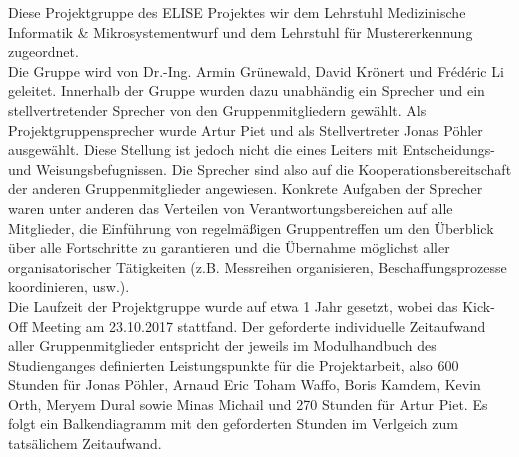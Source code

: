 

Diese Projektgruppe des ELISE Projektes wir dem Lehrstuhl Medizinische Informatik \& Mikrosystementwurf und dem Lehrstuhl für Mustererkennung zugeordnet. \\

Die Gruppe wird von Dr.-Ing. Armin Grünewald, David Krönert und Frédéric Li geleitet. 
Innerhalb der Gruppe wurden dazu unabhändig ein Sprecher und ein stellvertretender Sprecher von den Gruppenmitgliedern gewählt. Als Projektgruppensprecher wurde Artur Piet und als Stellvertreter Jonas Pöhler ausgewählt. 
Diese Stellung ist jedoch nicht die eines Leiters mit Entscheidungs- und Weisungsbefugnissen. Die Sprecher sind also auf die Kooperationsbereitschaft der anderen Gruppenmitglieder angewiesen. 
Konkrete Aufgaben der Sprecher waren unter anderen das Verteilen von Verantwortungsbereichen auf alle Mitglieder, die Einführung von regelmäßigen Gruppentreffen um den Überblick über alle Fortschritte zu garantieren und die Übernahme möglichst aller organisatorischer Tätigkeiten (z.B. Messreihen organisieren, Beschaffungsprozesse koordinieren, usw.). \\

Die Laufzeit der Projektgruppe wurde auf etwa 1 Jahr gesetzt, wobei das Kick-Off Meeting am 23.10.2017 stattfand. Der geforderte individuelle Zeitaufwand aller Gruppenmitglieder entspricht der jeweils im Modulhandbuch des Studienganges definierten Leistungspunkte für die Projektarbeit, also 600 Stunden für Jonas Pöhler, Arnaud Eric Toham Waffo, Boris Kamdem, Kevin Orth, Meryem Dural sowie Minas Michail und 270 Stunden für Artur Piet. Es folgt ein Balkendiagramm mit den geforderten Stunden im Verlgeich zum tatsälichem Zeitaufwand. \\

